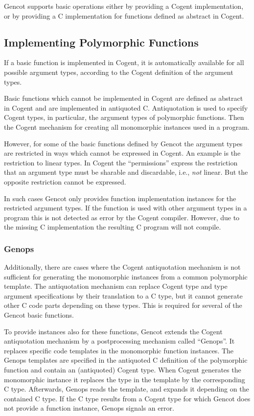 Gencot supports basic operations either by providing a Cogent implementation, or by providing
a C implementation for functions defined as abstract in Cogent.

\subsection{Implementing Polymorphic Functions}
\label{impl-operations-poly}

If a basic function is implemented in Cogent, it is automatically available for all possible argument types, according
to the Cogent definition of the argument types. 

Basic functions which cannot be implemented in Cogent are defined as abstract in Cogent and are implemented in
antiquoted C. Antiquotation is used to specify Cogent types, in particular, the argument types of polymorphic
functions. Then the Cogent mechanism for creating all monomorphic instances used in a program.

However, for some of the basic functions defined by Gencot the argument types are restricted in ways which cannot
be expressed in Cogent. An example is the restriction to linear types. In Cogent the ``permissions''  express 
the restriction that an argument type must be sharable and discardable, i.e., \textit{not} linear. But the opposite
restriction cannot be expressed. 

In such cases Gencot only provides function implementation instances for the restricted argument types. If the function
is used with other argument types in a program this is not detected as error by the Cogent compiler. However, due to 
the missing C implementation the resulting C program will not compile.

\subsubsection{Genops}

Additionally, there are cases where the Cogent antiquotation mechanism is not sufficient for generating the 
monomorphic instances from a common polymorphic template. The antiquotation mechanism can replace Cogent type
and type argument specifications by their translation to a C type, but it cannot generate other C code parts 
depending on these types. This is required for several of the Gencot basic functions.

To provide instances also for these functions, Gencot extends the Cogent antiquotation mechanism by a postprocessing
mechanism called ``Genops''. It replaces specific code templates in the monomorphic function instances. The Genops
templates are specified in the antiquoted C definition of the polymorphic function and contain an (antiquoted) 
Cogent type. When Cogent generates the monomorphic instance it replaces the type in the template by the 
corresponding C type. Afterwards, Genops reads the template, and expands it depending on the contained C type. 
If the C type results from a Cogent type for which Gencot does not provide a function instance, Genops signals
an error.

